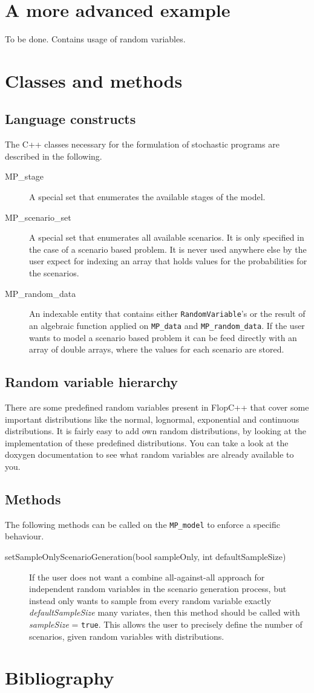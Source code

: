 \documentclass[a4paper,10pt,pdftex]{scrartcl}
\begin{document}
\section{A more advanced example}
To be done. Contains usage of random variables.

\section{Classes and methods}
 \subsection{Language constructs}
The C++ classes necessary for the formulation of stochastic programs are described in the following.
\begin{description}
 \item[MP\_stage] A special set that enumerates the available stages of the model.
 \item[MP\_scenario\_set] A special set that enumerates all available scenarios. It is only specified in the case of a scenario based problem. It is never used anywhere else by the user expect for indexing an array that holds values for the probabilities for the scenarios.
 \item[MP\_random\_data] An indexable entity that contains either \lstinline|RandomVariable|'s or the result of an algebraic function applied on \lstinline|MP_data| and \lstinline|MP_random_data|. If the user wants to model a scenario based problem it can be feed directly with an array of double arrays, where the values for each scenario are stored.  
\end{description}
\subsection{Random variable hierarchy}
There are some predefined random variables present in FlopC++ that cover some important distributions like the normal, lognormal, exponential and continuous distributions. It is fairly easy to add own random distributions, by looking at the implementation of these predefined distributions.
You can take a look at the doxygen documentation to see what random variables are already available to you.

\subsection{Methods}
The following methods can be called on the \lstinline|MP_model| to enforce a specific behaviour.
\begin{description}
 \item[setSampleOnlyScenarioGeneration(bool sampleOnly, int defaultSampleSize)] If the user does not want a combine all-against-all approach for independent random variables in the scenario generation process, but instead only wants to sample from every random variable exactly \emph{defaultSampleSize} many variates, then this method should be called with \emph{sampleSize} = \lstinline|true|. This allows the user to precisely define the number of scenarios, given random variables with distributions.
\end{description}



\section{Bibliography}


\end{document}
